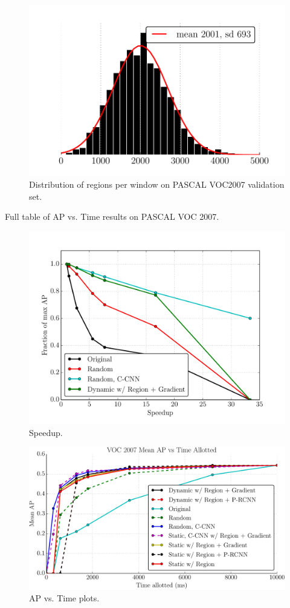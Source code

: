 \begin{figure}
\centering
\includegraphics[width=0.5\linewidth]{figures/roi_hist.pdf}
\caption{
    Distribution of regions per window on PASCAL VOC2007 validation set.
}\label{fig:roi_hist}
\end{figure}

\begin{table}[ht]
\centering
\caption{
Full table of AP vs. Time results on PASCAL VOC 2007.
}\label{tab:results}

\end{table}

\begin{figure}[ht]
\centering
\includegraphics[width=0.5\linewidth]{figures/_speedup.pdf}
\caption{
Speedup.
}\label{fig:speedup}
\end{figure}

\begin{figure}[ht]
\centering
\includegraphics[width=0.5\linewidth]{figures/_all_selected.pdf}
\caption{
AP vs. Time plots.
}\label{fig:apvst}
\end{figure}
